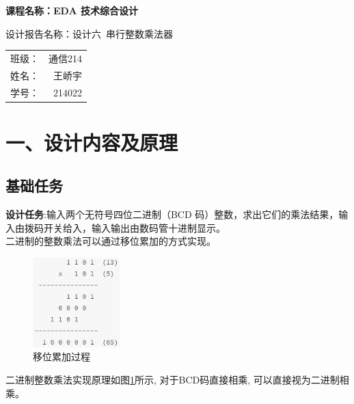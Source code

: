 \documentclass{article}
\newcommand{\fourhao}{\fontsize{14pt}{\baselineskip}\selectfont} %
\newcommand{\xiaosihao}{\fontsize{12pt}{\baselineskip}\selectfont} %
\begin{document}
\begin{titlepage}
    \centering
    \vspace*{2cm}

    \Huge
    \textbf{课程名称：EDA 技术综合设计}

    \vspace{2cm}

    \LARGE
    设计报告名称：设计六\ 串行整数乘法器

    \vspace{4cm}

    \centering
    \Large
    \begin{tabular}{rl}
        班级： & 通信214    \\
        姓名： & \ 王峤宇    \\
        学号： & \ 214022
    \end{tabular}

    \vfill

    \vspace{1cm}
\end{titlepage}

\newpage
\section*{\fourhao 一、设计内容及原理}
\xiaosihao
{}
\subsection*{基础任务}
\textbf{设计任务}:输入两个无符号四位二进制（BCD 码）整数，求出它们的乘法结果，输入由拨码开关给入，输入输出由数码管十进制显示。\\
二进制的整数乘法可以通过移位累加的方式实现。
\begin{figure}[htbp]
    \centering
    \includegraphics[width=0.3\textwidth]{image/2024-06-20-18-08-28.png}
    \caption{移位累加过程}
    \label{image_design_1}
\end{figure}
二进制整数乘法实现原理如图\ref{image_design_1}所示, 对于BCD码直接相乘, 可以直接视为二进制相乘。
\end{document}
